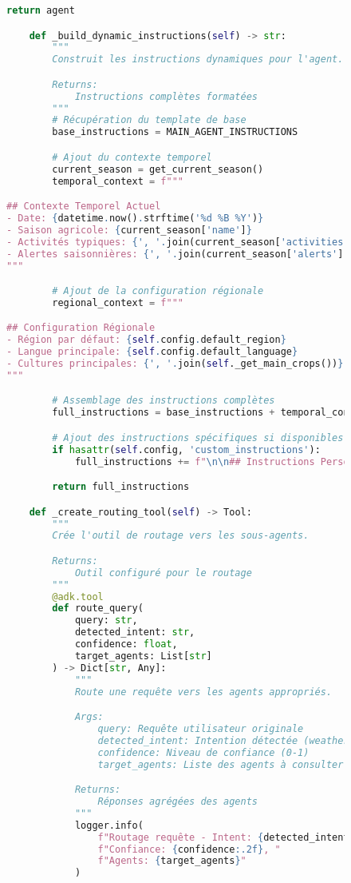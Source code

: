 \begin{figure}[H]
\begin{lstlisting}[language=Python, caption=Structure complète de l'agent principal]
        return agent

    def _build_dynamic_instructions(self) -> str:
        """
        Construit les instructions dynamiques pour l'agent.

        Returns:
            Instructions complètes formatées
        """
        # Récupération du template de base
        base_instructions = MAIN_AGENT_INSTRUCTIONS

        # Ajout du contexte temporel
        current_season = get_current_season()
        temporal_context = f"""

## Contexte Temporel Actuel
- Date: {datetime.now().strftime('%d %B %Y')}
- Saison agricole: {current_season['name']}
- Activités typiques: {', '.join(current_season['activities'])}
- Alertes saisonnières: {', '.join(current_season['alerts'])}
"""

        # Ajout de la configuration régionale
        regional_context = f"""

## Configuration Régionale
- Région par défaut: {self.config.default_region}
- Langue principale: {self.config.default_language}
- Cultures principales: {', '.join(self._get_main_crops())}
"""

        # Assemblage des instructions complètes
        full_instructions = base_instructions + temporal_context + regional_context

        # Ajout des instructions spécifiques si disponibles
        if hasattr(self.config, 'custom_instructions'):
            full_instructions += f"\n\n## Instructions Personnalisées\n{self.config.custom_instructions}"

        return full_instructions

    def _create_routing_tool(self) -> Tool:
        """
        Crée l'outil de routage vers les sous-agents.

        Returns:
            Outil configuré pour le routage
        """
        @adk.tool
        def route_query(
            query: str,
            detected_intent: str,
            confidence: float,
            target_agents: List[str]
        ) -> Dict[str, Any]:
            """
            Route une requête vers les agents appropriés.

            Args:
                query: Requête utilisateur originale
                detected_intent: Intention détectée (weather, crops, etc.)
                confidence: Niveau de confiance (0-1)
                target_agents: Liste des agents à consulter

            Returns:
                Réponses agrégées des agents
            """
            logger.info(
                f"Routage requête - Intent: {detected_intent}, "
                f"Confiance: {confidence:.2f}, "
                f"Agents: {target_agents}"
            )


\end{lstlisting}
\end{figure}
